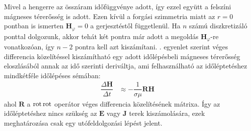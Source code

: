             \par
            Mivel a hengerre az összáram időfüggvénye adott, így ezzel együtt a felszíni mágneses térerősség is adott. Ezen kívül a forgási szimmetria miatt az $r=0$ pontban is ismerten $\textbf{H}_{\varphi}=0$ a gerjesztéstől függetlenül. Ha $n$ számú diszkretizáló ponttal dolgozunk, akkor tehát két pontra már adott a megoldás $\textbf{H}_{\varphi}$-re vonatkozóan, így $n-2$ pontra kell azt kiszámítani. . egyenlet szerint véges differencia közelítéssel kiszámítható egy adott időlépésbeli mágneses térerősség eloszlásából annak az idő szerinti deriváltja, ami felhasználható az időléptetéshez mindkétféle időlépéses sémában:
            \begin{equation}\label{equ:DhDt}
                \begin{aligned}
                    \dfrac{\Delta \textbf{H}}{\Delta t} &\approx -\dfrac{1}{\sigma\mu}\mathbf{R}\textbf{H}
                \end{aligned}
            \end{equation}
            ahol $\mathbf{R}$ a $\operatorname{rot}\operatorname{rot}$ operátor véges differencia közelítésének mátrixa.
            Így az időléptetéshez nincs szükség az $\textbf{E}$ vagy $\textbf{J}$ terek kiszámolására, ezek meghatározása csak egy utófeldolgozási lépést jelent.
